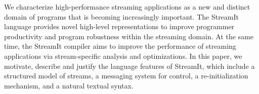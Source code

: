 We characterize high-performance streaming applications as a new and
distinct domain of programs that is becoming increasingly important.
The StreamIt language provides novel high-level representations to
improve programmer productivity and program robustness within the
streaming domain.  At the same time, the StreamIt compiler aims to
improve the performance of streaming applications via stream-specific
analysis and optimizations.  In this paper, we motivate, describe and
justify the language features of StreamIt, which include a structured
model of streams, a messaging system for control, a re-initialization
mechanism, and a natural textual syntax.

